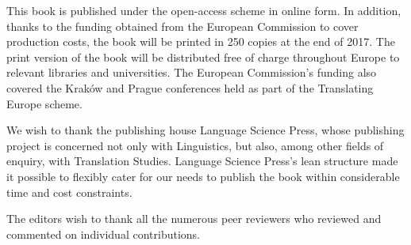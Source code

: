 This book is published under the open-access scheme in online form. In addition, thanks to the funding obtained from the European Commission to cover production costs, the book will be printed in 250 copies at the end of 2017. The print version of the book will be distributed free of charge throughout Europe to relevant libraries and universities. The European Commission’s funding also covered the Kraków and Prague conferences held as part of the Translating Europe scheme.

We wish to thank the publishing house Language Science Press, whose publishing project is concerned not only with Linguistics, but also, among other fields of enquiry, with Translation Studies. Language Science Press's lean structure made it possible to flexibly cater for our needs to publish the book within considerable time and cost constraints.

The editors wish to thank all the numerous peer reviewers who reviewed and commented on individual contributions. 

